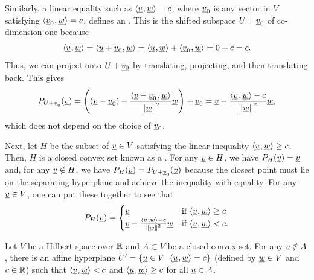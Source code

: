 Similarly, a linear equality such as ${\langle \underline v \mskip1mu , \underline w \rangle}=c$, where $\underline v_{0}$ is any vector in $V$ satisfying ${\langle \underline v_{0} \mskip1mu , \underline w \rangle}=c$,  defines an .
This is the shifted subspace $U+\underline v_{0}$ of co-dimension one because 
\[
{\langle \underline v \mskip1mu , \underline w \rangle}={\langle \underline u+\underline v_{0} \mskip1mu , \underline w \rangle}={\langle \underline u \mskip1mu , \underline w \rangle}+{\langle \underline v_{0} \mskip1mu , \underline w \rangle}=0+c=c.
\]
Thus, we can project onto $U+\underline{v_{0}}$ by translating, projecting, and then translating back. This gives
\begin{equation*}
P_{U+\underline v_{0}}(\underline v)=\left((\underline v-\underline v_{0})-\frac{{\left\langle  \underline v-\underline v_{0} \mskip2mu , \underline w \right\rangle} }{\left\Vert \underline w\right\Vert ^{2}}\underline w\right)+\underline v_{0}=\underline v-\frac{{\left\langle  \underline v \mskip2mu , \underline w \right\rangle} -c}{\left\Vert \underline w\right\Vert ^{2}}\underline w,\label{eq:proj_lin_eq}
\end{equation*}
which does not depend on the choice of $\underline v_{0}$.

Next, let $H$ be the subset of $\underline v\in V$ satisfying the linear inequality ${\langle \underline v \mskip1mu , \underline w \rangle}\geq c$. Then, $H$ is a closed convex set known as a . For any $\underline v\in H$, we have $P_{H}(\underline v)=\underline v$ and, for any $\underline v\notin H$, we have $P_{H}(\underline v)=P_{U+\underline v_{0}}(\underline v)$ because the closest point must lie on the separating hyperplane and achieve the inequality with equality. For any $\underline v\in V$, one can put these together to see that
\begin{equation}
P_{H}(\underline v)=\begin{cases}
\underline v & \text{if }{\langle \underline v \mskip1mu , \underline w \rangle}\geq c\\
\underline v-\frac{{\left\langle  \underline v \mskip2mu , \underline w \right\rangle} -c}{\left\Vert \underline w\right\Vert ^{2}}\underline w & \text{if }{\langle \underline v \mskip1mu , \underline w \rangle}<c.
\end{cases}\label{eq:proj_ineq}
\end{equation}

\begin{theorem} \label{theorem:convex_point_set_hyperplane}
Let $V$ be a Hilbert space over $\mathbb{R}$ and $A\subset V$ be a closed convex set.
For any $\underline{v} \notin A$, there is an affine hyperplane $U' = \{ \underline{u} \in V \,|\, {\langle  \underline{u}  \mskip1mu ,  \underline{w}  \rangle} = c \}$ (defined by $\underline{w} \in V$ and $c\in \mathbb{R}$) such that ${\langle  \underline{v}  \mskip1mu ,  \underline{w}  \rangle} < c$ and ${\langle  \underline{u}  \mskip1mu ,  \underline{w}  \rangle} \geq c$ for all $\underline{u} \in A$.
\end{theorem}

